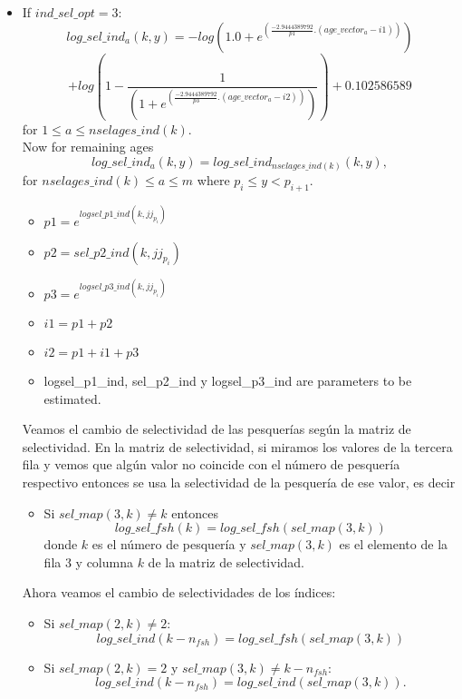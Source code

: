 \documentclass{article}
\begin{document}
\begin{itemize}
    \item If $ind\_sel\_opt=3:$
     \begin{equation}
        log\_sel\_ind_a(k,y)     =  -log(1.0 + e^{(\frac{-2.9444389792}{p1} . ( age\_vector_a - i1) )}) 
\end{equation}
    \begin{equation}
          +log\left(1 - \frac{1}{(1 + e^{(\frac{-2.9444389792}{p3} . ( age\_vector_a - i2))})}  \right)+0.102586589 
    \end{equation}
for $1\leq a \leq nselages\_ind(k).$ \\

    Now for remaining ages
    \begin{equation}
         log\_sel\_ind_a(k,y) = log\_sel\_ind_{nselages\_ind(k)}(k,y),
    \end{equation}
    for $nselages\_ind(k)\leq a \leq m$ where $p_i\leq y < p_{i+1}$.
\begin{itemize}
    \item $p1 = e^{logsel\_p1\_ind(k,jj_{p_i})}$
    \item $p2 = sel\_p2\_ind(k,jj_{p_i})$
    \item $p3 = e^{logsel\_p3\_ind(k,jj_{p_i})}$
    \item $i1 = p1 + p2$
    \item $i2 = p1 + i1 + p3$
    \item logsel\_p1\_ind, sel\_p2\_ind y logsel\_p3\_ind are parameters to be estimated.
\end{itemize}
Veamos el cambio de selectividad de las pesquerías según la matriz de selectividad.
En la matriz de selectividad, si miramos los valores de la tercera fila y vemos que algún valor no coincide con el número de pesquería respectivo entonces se usa la selectividad de la pesquería de ese valor, es decir
\begin{itemize}
    \item Si $sel\_map(3,k) \neq k$ entonces
    \begin{equation}
        log\_sel\_fsh(k)=log\_sel\_fsh(sel\_map(3,k))
    \end{equation}
    donde $k$ es el número de pesquería y $sel\_map(3,k)$ es el elemento de la fila 3 y columna $k$ de la matriz de selectividad. 
\end{itemize}

Ahora veamos el cambio de selectividades de los índices:
\begin{itemize}
    \item Si $sel\_map(2,k) \neq 2$:
    \begin{equation}
        log\_sel\_ind(k-n_{fsh})=log\_sel\_fsh(sel\_map(3,k))
    \end{equation}
    \item Si $sel\_map(2,k) = 2$ y $sel\_map(3,k) \neq k-n_{fsh}$:
    \begin{equation}
        log\_sel\_ind(k-n_{fsh}) = log\_sel\_ind(sel\_map(3,k)).
    \end{equation}
\end{itemize}

   
\end{itemize}
\end{document}
